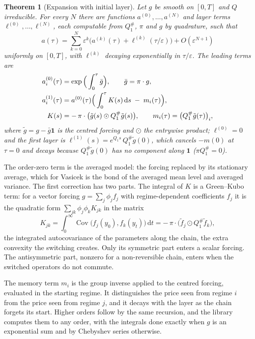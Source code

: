 \documentclass[11pt]{article}
\newtheorem{theorem}{Theorem}
\theoremstyle{remark}
\newcommand{\dd}{\,\mathrm{d}}
\newcommand{\eps}{\varepsilon}
\begin{document}
\begin{theorem}[Expansion with initial layer]
\label{thm:expansion}
Let $g$ be smooth on $[0,T]$ and $Q$ irreducible. For every $N$ there are functions $a^{(0)},\dots,a^{(N)}$ and
layer terms $\ell^{(0)},\dots,\ell^{(N)}$, each computable from $Q_1^{\#}$, $\pi$ and $g$ by quadrature, such that
\[
  a(\tau) = \sum_{k=0}^{N} \eps^k\big(a^{(k)}(\tau) + \ell^{(k)}(\tau/\eps)\big) + O(\eps^{N+1})
\]
uniformly on $[0,T]$, with $\ell^{(k)}$ decaying exponentially in $\tau/\eps$. The leading terms are
\begin{align}
  a^{(0)}_i(\tau) &= \exp\Big(\int_0^\tau \bar g\Big), \qquad \bar g = \pi\cdot g, \label{eq:order0}\\
  a^{(1)}_i(\tau) &= a^{(0)}(\tau)\Big(\int_0^\tau K(s)\dd s \;-\; m_i(\tau)\Big), \label{eq:order1}\\
  K(s) &= -\,\pi\cdot\big(\tilde g(s)\odot Q_1^{\#}\tilde g(s)\big), \qquad m_i(\tau) = \big(Q_1^{\#}\tilde g(\tau)\big)_i, \notag
\end{align}
where $\tilde g = g - \bar g\mathbf 1$ is the centred forcing and $\odot$ the entrywise product; $\ell^{(0)} = 0$ and
the first layer is $\ell^{(1)}(s) = e^{Q_1 s}\,Q_1^{\#}\tilde g(0)$, which cancels $-m(0)$ at $\tau = 0$ and decays
because $Q_1^{\#}\tilde g(0)$ has no component along $\mathbf 1$ ($\pi Q_1^{\#} = 0$).
\end{theorem}

The order-zero term is the averaged model: the forcing replaced by its stationary average, which for Vasicek is
the bond of the averaged mean level and averaged variance. The first correction has two parts. The integral of
$K$ is a Green--Kubo term: for a vector forcing $g = \sum_j \phi_j f_j$ with regime-dependent coefficients $f_j$
it is the quadratic form $\sum_{jk}\phi_j\phi_k K_{jk}$ in the matrix
\begin{equation}
  K_{jk} = \int_0^\infty \operatorname{Cov}\big(f_j(y_0), f_k(y_t)\big)\dd t = -\,\pi\cdot\big(\tilde f_j \odot Q_1^{\#}\tilde f_k\big),
  \label{eq:gk}
\end{equation}
the integrated autocovariance of the parameters along the chain, the extra convexity the switching creates. Only
its symmetric part enters a scalar forcing. The antisymmetric part, nonzero for a non-reversible chain, enters
when the switched operators do not commute.

The memory term $m_i$ is the group inverse applied to the centred forcing, evaluated in the starting regime. It
distinguishes the price seen from regime $i$ from the price seen from regime $j$, and it decays with the layer as
the chain forgets its start. Higher orders follow by the same recursion, and the library computes them to any
order, with the integrals done exactly when $g$ is an exponential sum and by Chebyshev series otherwise.
\end{document}
